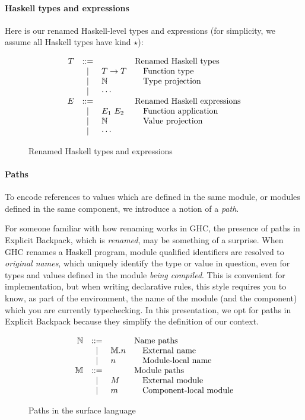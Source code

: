\documentclass{article}
\begin{document}
\paragraph{Haskell types and expressions}
Here is our renamed Haskell-level types and expressions
(for simplicity, we assume all Haskell types have kind $\star$):

\begin{figure}[H]
\[
\begin{array}{rcll}
T &::=& & \mbox{Renamed Haskell types} \\
     & | & T \rightarrow T & \quad\mbox{Function type} \\
     & | & \mathbb{N} & \quad\mbox{Type projection} \\
     & | & \cdots \\
E &::=& & \mbox{Renamed Haskell expressions} \\
  & | & E_1~E_2 & \quad\mbox{Function application} \\
  & | & \mathbb{N} & \quad\mbox{Value projection} \\
  & | & \cdots & \\
\end{array}
\]
\caption{Renamed Haskell types and expressions}
\end{figure}

\paragraph{Paths}
To encode references to values which are defined in the same
module, or modules defined in the same component, we introduce
a notion of a \emph{path}.

For someone familiar with how renaming works in GHC, the presence
of paths in Explicit Backpack, which is \emph{renamed}, may be something of a surprise.  When
GHC renames a Haskell program, module qualified identifiers are
resolved to \emph{original names}, which uniquely identify the type
or value in question, even for types and values defined in the
module \emph{being compiled}.  This is convenient for implementation,
but when writing declarative rules, this style requires you to know,
as part of the environment, the name of the module (and the component)
which you are currently typechecking.  In this presentation, we opt
for paths in Explicit Backpack because they simplify the definition of
our context.

\begin{figure}[H]
\[
\begin{array}{rcll}
\mathbb{N} &::=&     & \mbox{Name paths} \\
  & | & \mathbb{M}.n & \quad\mbox{External name} \\
  & | & n   & \quad\mbox{Module-local name} \\
\mathbb{M} &::=& & \mbox{Module paths} \\
  & | & M & \quad\mbox{External module} \\
  & | & m & \quad\mbox{Component-local module} \\
\end{array}
\]
\caption{Paths in the surface language}
\end{figure}
\end{document}
